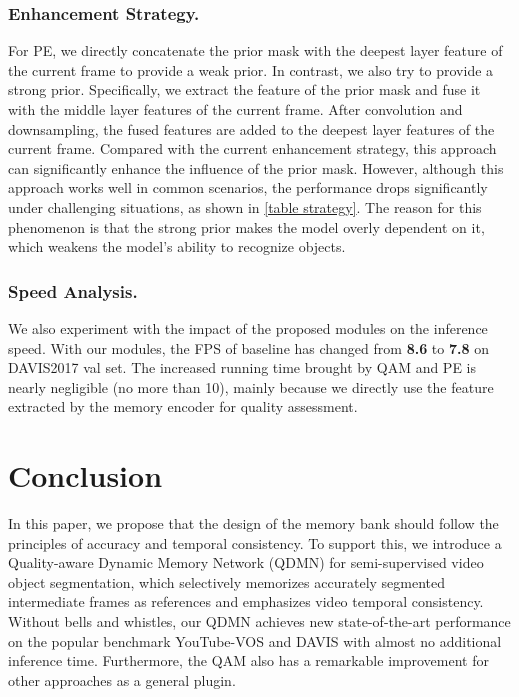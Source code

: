 \documentclass[runningheads]{llncs}
\begin{document}
         \subsubsection{Enhancement Strategy.} 
    For PE, we directly concatenate the prior mask with the deepest layer feature of the current frame to provide a weak prior. In contrast, we also try to provide a strong prior. Specifically,  we extract the feature of the prior mask and fuse it with the middle layer features of the current frame. After convolution and downsampling, the fused features are added to the deepest layer features of the current frame. Compared with the current enhancement strategy, this approach can significantly enhance the influence of the prior mask. However, although this approach works well in common scenarios, the performance drops significantly under challenging situations, as shown in \cref{table strategy}.
    The reason for this phenomenon is that the strong prior makes the model overly dependent on it, which weakens the model's ability to recognize objects.
    

    
    \subsubsection{Speed Analysis.} We also experiment with the impact of the proposed modules on the inference speed. With our modules, the FPS of baseline has changed from \textbf{8.6} to \textbf{7.8} on DAVIS2017 val set. 
    The increased running time brought by QAM and PE is nearly negligible (no more than 10), mainly because we directly use the feature extracted by the memory encoder for quality assessment. 
\section{Conclusion}
    In this paper, we propose that the design of the memory bank should follow the principles of accuracy and temporal consistency.
    To support this, we introduce a Quality-aware Dynamic Memory Network (QDMN) for semi-supervised video object segmentation, which selectively memorizes accurately segmented intermediate frames as references and emphasizes video temporal consistency.
    Without bells and whistles, our QDMN achieves new state-of-the-art performance on the popular benchmark YouTube-VOS and DAVIS with almost no additional inference time. Furthermore, the QAM also has a remarkable improvement for other approaches as a general plugin. 
     
\end{document}
